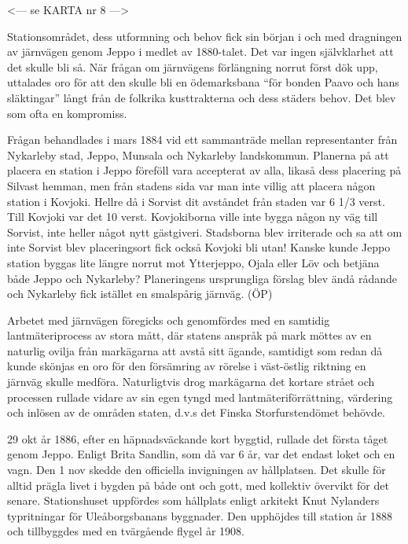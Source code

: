 
<--- se KARTA nr 8 --->




\jhnooccupant{}


Stationsområdet, dess utformning och behov fick sin början i och med dragningen av järnvägen genom Jeppo i medlet av 1880-talet. Det var ingen självklarhet att det skulle bli så. När frågan om järnvägens förlängning norrut först dök upp, uttalades oro för att den skulle bli en ödemarksbana ``för bonden Paavo och hans släktingar'' långt från de folkrika kusttrakterna och dess städers behov. Det blev som ofta en kompromiss.

Frågan behandlades i mars 1884 vid ett sammanträde mellan representanter från Nykarleby stad, Jeppo, Munsala och Nykarleby landskommun. Planerna på att placera en station i Jeppo föreföll vara accepterat av alla, likaså dess placering på Silvast hemman, men från stadens sida var man inte villig att placera någon station i Kovjoki. Hellre då i Sorvist dit avståndet från staden var 6 1/3 verst. Till Kovjoki var det 10 verst. Kovjokiborna ville inte bygga någon ny väg till Sorvist, inte heller något nytt gästgiveri. Stadsborna blev irriterade och sa att om inte Sorvist blev placeringsort fick också Kovjoki bli utan! Kanske kunde Jeppo station byggas lite längre norrut mot Ytterjeppo, Ojala eller Löv och betjäna både Jeppo och Nykarleby? Planeringens ursprungliga förslag blev ändå rådande och Nykarleby fick istället en smalspårig järnväg. (ÖP)


Arbetet med järnvägen föregicks och genomfördes med en samtidig lantmäteriprocess av stora mått, där statens anspråk på mark möttes av en naturlig ovilja från markägarna att avstå sitt ägande, samtidigt som redan då kunde skönjas en oro för den försämring av rörelse i väst-östlig riktning en järnväg skulle medföra. Naturligtvis drog markägarna det kortare strået och processen rullade vidare av sin egen tyngd med lantmäteriförrättning, värdering och inlösen av de områden staten, d.v.s det Finska Storfurstendömet behövde.

29 okt år 1886, efter en häpnadsväckande kort byggtid, rullade det första tåget genom Jeppo. Enligt Brita Sandlin, som då var 6 år, var det endast loket och en vagn. Den 1 nov skedde den officiella invigningen av hållplatsen. Det skulle för alltid prägla livet i bygden på både ont och gott, med kollektiv övervikt för det senare. Stationshuset uppfördes som hållplats enligt arkitekt Knut Nylanders typritningar för Uleåborgsbanans byggnader. Den upphöjdes till station år 1888 och tillbyggdes med en tvärgående flygel år 1908.


